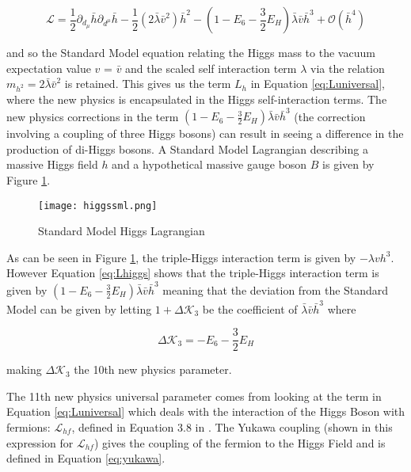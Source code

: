 \documentclass[11pt,oneside,a4paper]{article}
\begin{document}
\begin{equation}
\label{eq:Lhiggs}
\mathcal{L} = \frac{1}{2}\partial_{d_\mu}\bar{h}\partial_{d^{\mu}}\bar{h} - \frac{1}{2}(2\bar{\lambda}\bar{v}^2)\bar{h}^2 - (1-E_{6}-\frac{3}{2}E_{H})\bar{\lambda}\bar{v}\bar{h}^3+\mathcal{O}(\bar{h}^4)
\end{equation}


and so the Standard Model equation relating the Higgs mass to the vacuum expectation value $v$ = $\bar{v}$ and the scaled self interaction term $\lambda$ via the relation $m_{h^2} = 2\bar{\lambda}\bar{v}^{2}$  is retained. This gives us the term $L_{h}$ in Equation \ref{eq:Luniversal}, where the new physics is encapsulated in the Higgs self-interaction terms. The new physics corrections in the term $(1-E_{6}-\frac{3}{2}E_{H})\bar{\lambda}\bar{v}\bar{h}^3$ (the correction involving a coupling of three Higgs bosons) can result in seeing a difference in the production of di-Higgs bosons. A Standard Model Lagrangian describing a massive Higgs field $h$ and a hypothetical massive gauge boson $B$ is given by Figure \ref{fig:higgssml}.

\begin{figure}[htbp]
	\centering
	\texttt{[image: higgssml.png]}
	\caption{Standard Model Higgs Lagrangian}
	\label{fig:higgssml}
\end{figure}


As can be seen in Figure \ref{fig:higgssml}, the triple-Higgs interaction term is given by $-\lambda v h^{3}$. However Equation \ref{eq:Lhiggs} shows that the triple-Higgs interaction term is given by $(1-E_{6}-\frac{3}{2}E_{H})\bar{\lambda}\bar{v}\bar{h}^3$ meaning that the deviation from the Standard Model can be given by letting $1+\Delta\mathcal{K}_{3}$ be the coefficient of $\bar{\lambda}\bar{v}\bar{h}^3$ where 

\begin{equation}
\label{eq:higgsdeviation}
\Delta\mathcal{K}_{3} = -E_{6} - \frac{3}{2}E_{H}
\end{equation}

making $\Delta\mathcal{K}_{3}$ the 10th new physics parameter. 

The 11th new physics universal parameter comes from looking at the term in Equation \ref{eq:Luniversal} which deals with the interaction of the Higgs Boson with fermions: $\mathcal{L}_{hf}$, defined in Equation 3.8 in \cite{universal}. The Yukawa coupling (shown in this expression for $\mathcal{L}_{hf}$) gives the coupling of the fermion to the Higgs Field and is defined in Equation \ref{eq:yukawa}. 
\end{document}
